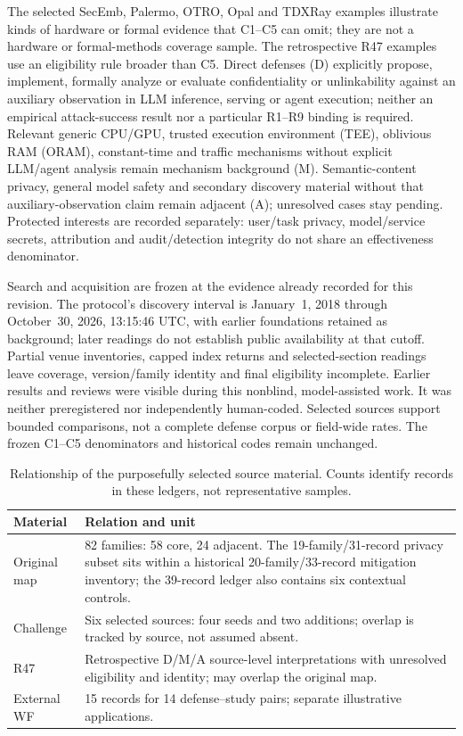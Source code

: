The selected SecEmb, Palermo, OTRO, Opal and TDXRay examples illustrate kinds of hardware or formal evidence that C1--C5 can omit; they are not a hardware or formal-methods coverage sample. The retrospective R47 examples use an eligibility rule broader than C5. Direct defenses (D) explicitly propose, implement, formally analyze or evaluate confidentiality or unlinkability against an auxiliary observation in LLM inference, serving or agent execution; neither an empirical attack-success result nor a particular R1--R9 binding is required. Relevant generic CPU/GPU, trusted execution environment (TEE), oblivious RAM (ORAM), constant-time and traffic mechanisms without explicit LLM/agent analysis remain mechanism background (M). Semantic-content privacy, general model safety and secondary discovery material without that auxiliary-observation claim remain adjacent (A); unresolved cases stay pending. Protected interests are recorded separately: user/task privacy, model/service secrets, attribution and audit/detection integrity do not share an effectiveness denominator.

Search and acquisition are frozen at the evidence already recorded for this revision. The protocol's discovery interval is January~1, 2018 through October~30, 2026, 13:15:46 UTC, with earlier foundations retained as background; later readings do not establish public availability at that cutoff. Partial venue inventories, capped index returns and selected-section readings leave coverage, version/family identity and final eligibility incomplete. Earlier results and reviews were visible during this nonblind, model-assisted work. It was neither preregistered nor independently human-coded. Selected sources support bounded comparisons, not a complete defense corpus or field-wide rates. The frozen C1--C5 denominators and historical codes remain unchanged.

\begin{table}[t]
\caption{Relationship of the purposefully selected source material. Counts identify records in these ledgers, not representative samples.}\label{tab:source-ledger}
\centering\footnotesize
\begin{tabularx}{\columnwidth}{lY}\toprule
Material & Relation and unit \\ \midrule
Original map & 82 families: 58 core, 24 adjacent. The 19-family/31-record privacy subset sits within a historical 20-family/33-record mitigation inventory; the 39-record ledger also contains six contextual controls. \\
Challenge & Six selected sources: four seeds and two additions; overlap is tracked by source, not assumed absent. \\
R47 & Retrospective D/M/A source-level interpretations with unresolved eligibility and identity; may overlap the original map. \\
External WF & 15 records for 14 defense--study pairs; separate illustrative applications. \\
\bottomrule\end{tabularx}
\end{table}

